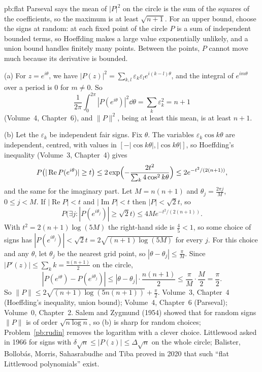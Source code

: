 \begin{solution}{pb:flat}
\idea Parseval says the mean of $|P|^2$ on the circle is the sum of the squares of the coefficients, so the maximum is at
least $\sqrt{n+1}$. For an upper bound, choose the signs at random: at each fixed point of the circle $P$ is a sum of
independent bounded terms, so Hoeffding makes a large value exponentially unlikely, and a union bound handles finitely many
points. Between the points, $P$ cannot move much because its derivative is bounded.

\writeup (a) For $z=e^{i\theta}$, we have $|P(z)|^2=\sum_{k,l}\varepsilon_k\varepsilon_le^{i(k-l)\theta}$, and the integral of
$e^{im\theta}$ over a period is $0$ for $m\ne0$. So
\[
\frac1{2\pi}\int_0^{2\pi}|P(e^{i\theta})|^2\dd\theta=\sum_k\varepsilon_k^2=n+1
\]
(Volume~4, Chapter~6), and $\|P\|^2$, being at least this mean, is at least $n+1$.

(b) Let the $\varepsilon_k$ be independent fair signs. Fix $\theta$. The variables $\varepsilon_k\cos k\theta$ are independent,
centred, with values in $[-|\cos k\theta|,|\cos k\theta|]$, so Hoeffding's inequality (Volume~3, Chapter~4) gives
\[
P\bigl(|\operatorname{Re}P(e^{i\theta})|\ge t\bigr)\le2\exp\Bigl(-\frac{2t^2}{\sum_k4\cos^2k\theta}\Bigr)\le2e^{-t^2/(2(n+1))},
\]
and the same for the imaginary part. Let $M=n(n+1)$ and $\theta_j=\frac{2\pi j}M$, $0\le j<M$. If $|\operatorname{Re}P|<t$ and
$|\operatorname{Im}P|<t$ then $|P|<\sqrt2t$, so
\[
P\bigl(\exists j:|P(e^{i\theta_j})|\ge\sqrt2t\bigr)\le4Me^{-t^2/(2(n+1))}.
\]
With $t^2=2(n+1)\log(5M)$ the right-hand side is $\frac45<1$, so some choice of signs has $|P(e^{i\theta_j})|<\sqrt2t=
2\sqrt{(n+1)\log(5M)}$ for every $j$. For this choice and any $\theta$, let $\theta_j$ be the nearest grid point, so
$|\theta-\theta_j|\le\frac\pi M$. Since $|P'(z)|\le\sum_kk=\frac{n(n+1)}2$ on the circle,
\[
|P(e^{i\theta})-P(e^{i\theta_j})|\le|\theta-\theta_j|\cdot\frac{n(n+1)}2\le\frac\pi M\cdot\frac M2=\frac\pi2.
\]
So $\|P\|\le2\sqrt{(n+1)\log(5n(n+1))}+\frac\pi2$.
\tools Volume~3, Chapter~4 (Hoeffding's inequality, union bound); Volume~4, Chapter~6 (Parseval); Volume~0, Chapter~2.
\leads Salem and Zygmund (1954) showed that for random signs $\|P\|$ is of order $\sqrt{n\log n}$, so (b) is sharp for random
choices; Problem~\ref{pb:rudin} removes the logarithm with a clever choice. Littlewood asked in 1966 for signs with
$\delta\sqrt n\le|P(z)|\le\Delta\sqrt n$ on the whole circle; Balister, Bollobás, Morris, Sahasrabudhe and Tiba proved in 2020
that such ``flat Littlewood polynomials'' exist.
\end{solution}

